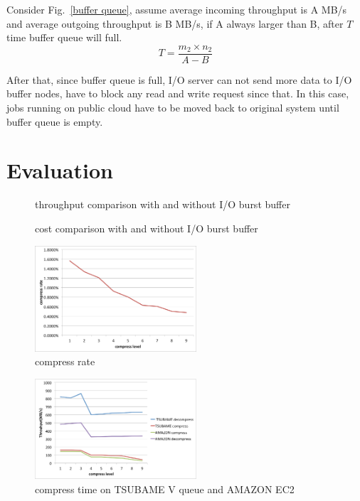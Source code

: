 \documentclass[JIP,draft]{ipsj}
\begin{document}
Consider Fig.~\ref{buffer queue}, assume average incoming throughput is A MB/s and average outgoing throughput is B MB/s, if A always larger than B, after $T$ time buffer queue will full.
\[T=\frac{m_2\times n_2}{A-B}\]

After that, since buffer queue is full, I/O server can not send more data to I/O buffer nodes, have to block any read and write request since that.
In this case, jobs running on public cloud have to be moved back to original system until buffer queue is empty.

\section{Evaluation}

\begin{figure}[tb]
	\centering
	\caption{throughput comparison with and without I/O burst buffer}
	\label{throughput}
\end{figure}

\begin{figure}[tb]
	\centering
	\caption{cost comparison with and without I/O burst buffer}
	\label{cost}
\end{figure}

\begin{figure}[tb]
	\centering
	\includegraphics[width=6cm]{compress_rate}
	\caption{compress rate}
	\label{compress rate}
\end{figure}

\begin{figure}[tb]
	\centering
	\includegraphics[width=6cm]{compress_time}
	\caption{compress time on TSUBAME V queue and AMAZON EC2}
	\label{compress time}
\end{figure}
\end{document}
